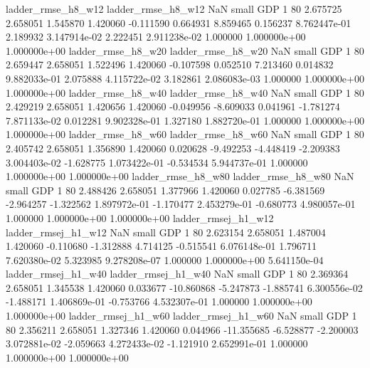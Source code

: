       ladder_rmse_h8_w12       ladder_rmse_h8_w12                   NaN      small      GDP                 1 80 2.675725       2.658051 1.545870       1.420060   -0.111590      0.664931      8.859465     0.156237   8.762447e-01  2.189932 3.147914e-02     2.222451   2.911238e-02            1.000000    1.000000e+00        1.000000e+00
      ladder_rmse_h8_w20       ladder_rmse_h8_w20                   NaN      small      GDP                 1 80 2.659447       2.658051 1.522496       1.420060   -0.107598      0.052510      7.213460     0.014832   9.882033e-01  2.075888 4.115722e-02     3.182861   2.086083e-03            1.000000    1.000000e+00        1.000000e+00
      ladder_rmse_h8_w40       ladder_rmse_h8_w40                   NaN      small      GDP                 1 80 2.429219       2.658051 1.420656       1.420060   -0.049956     -8.609033      0.041961    -1.781274   7.871133e-02  0.012281 9.902328e-01     1.327180   1.882720e-01            1.000000    1.000000e+00        1.000000e+00
      ladder_rmse_h8_w60       ladder_rmse_h8_w60                   NaN      small      GDP                 1 80 2.405742       2.658051 1.356890       1.420060    0.020628     -9.492253     -4.448419    -2.209383   3.004403e-02 -1.628775 1.073422e-01    -0.534534   5.944737e-01            1.000000    1.000000e+00        1.000000e+00
      ladder_rmse_h8_w80       ladder_rmse_h8_w80                   NaN      small      GDP                 1 80 2.488426       2.658051 1.377966       1.420060    0.027785     -6.381569     -2.964257    -1.322562   1.897972e-01 -1.170477 2.453279e-01    -0.680773   4.980057e-01            1.000000    1.000000e+00        1.000000e+00
     ladder_rmsej_h1_w12      ladder_rmsej_h1_w12                   NaN      small      GDP                 1 80 2.623154       2.658051 1.487004       1.420060   -0.110680     -1.312888      4.714125    -0.515541   6.076148e-01  1.796711 7.620380e-02     5.323985   9.278208e-07            1.000000    1.000000e+00        5.641150e-04
     ladder_rmsej_h1_w40      ladder_rmsej_h1_w40                   NaN      small      GDP                 1 80 2.369364       2.658051 1.345538       1.420060    0.033677    -10.860868     -5.247873    -1.885741   6.300556e-02 -1.488171 1.406869e-01    -0.753766   4.532307e-01            1.000000    1.000000e+00        1.000000e+00
     ladder_rmsej_h1_w60      ladder_rmsej_h1_w60                   NaN      small      GDP                 1 80 2.356211       2.658051 1.327346       1.420060    0.044966    -11.355685     -6.528877    -2.200003   3.072881e-02 -2.059663 4.272433e-02    -1.121910   2.652991e-01            1.000000    1.000000e+00        1.000000e+00
